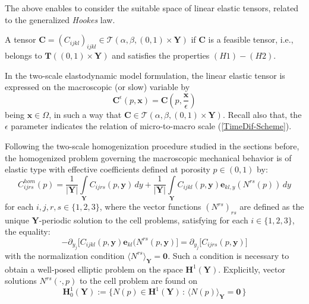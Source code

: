 The above enables to consider the suitable space of linear elastic tensors, related to the generalized \textit{Hookes} law.
\begin{defn}
A tensor $\mathbf{C} = (C_{ijkl})_{ijkl} \in \mathcal{T}(\alpha, \beta, (0,1)\times \mathbf{Y})$
if $\mathbf{C}$ is a feasible tensor, i.e., belongs to $\mathbf{T}((0,1)\times \mathbf{Y})$ and satisfies the properties $(H1)-(H2)$.
\end{defn}
\begin{rem}
In the two-scale elastodynamic model formulation, the linear elastic tensor is expressed on the macroscopic (or slow) variable by
\begin{equation*}
    \mathbf{C}^{\epsilon}(p,\mathbf{x}) =\mathbf{C}(p,\frac{\mathbf{x}}{\epsilon})
\end{equation*} being $\mathbf{x}\in \Omega$, in such a way that $\mathbf{C} \in \mathcal{T}(\alpha, \beta, (0,1)\times \mathbf{Y})$. Recall also that, the $\epsilon$ parameter indicates the relation of micro-to-macro scale (\ref{TimeDif-Scheme}).
\end{rem}
Following the two-scale homogenization procedure studied in the sections before, the homogenized problem governing the macroscopic mechanical behavior is of elastic type with effective coefficients defined at porosity $p \in (0,1)$ by:
\begin{equation}
    \label{eq:homogenized-coeff}
    C^{hom}_{ijrs}(p) = \frac{1}{\vert \mathbf{Y}\vert} \int\limits_{\mathbf{Y}} C_{ijrs}(p,\mathbf{y}) \, dy + \frac{1}{\vert \mathbf{Y}\vert} \int\limits_{\mathbf{Y}} C_{ijkl}(p,\mathbf{y}) \mathbf{e}_{kl,y}( N^{rs}(p))\,dy
\end{equation}
for each $ i,j,r,s \in \{1,2,3\}$, where the vector functions $(N^{rs})_{rs}$ are defined as the unique $\mathbf{Y}$-periodic solution to the cell problems, satisfying for each $i \in \{1,2,3\}$, the equality:
\begin{equation}
    \label{eq:cell}
    -\partial_{y_j} \big[ C_{ijkl}(p,\mathbf{y}) \mathbf{e}_{kl}(N^{rs}(p,\mathbf{y}) \big] = \partial_{y_j} \big[ C_{ijrs}(p,\mathbf{y}) \big] 
\end{equation}
with the normalization condition $\langle N^{rs} \rangle_{\mathbf{Y}} = \mathbf{0}$. Such a condition is necessary to obtain a well-posed elliptic problem on the space $\mathbf{H}^1(\mathbf{Y})$.
Explicitly, vector solutions $N^{rs}(\cdot,p)$ to the cell problem are found on   
\begin{equation*}
    \mathbf{H}^1_{ 0} (\mathbf{Y}) := \big \{ N(p) \in  \mathbf{H}^1(\mathbf{Y}) \, : \, \langle N(p) \rangle_{\mathbf{Y}}=\mathbf{0} \, \big \}
\end{equation*}

